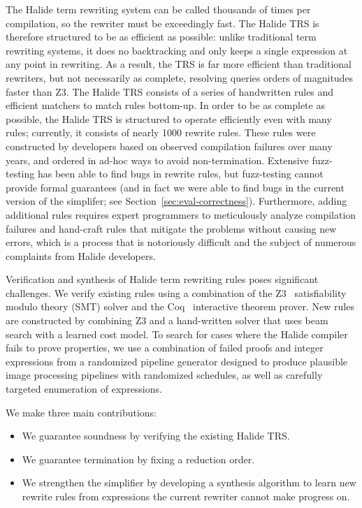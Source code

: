 \documentclass[sigplan,10pt,review,anonymous]{acmart}\settopmatter{printfolios=true,printccs=false,printacmref=false}
\begin{document}
The Halide term rewriting system can be called thousands of times per
compilation, so the rewriter must be exceedingly fast.  The Halide
TRS is therefore structured to be as efficient as possible: unlike traditional
term rewriting systems, it does no backtracking and only keeps a single expression
at any point in rewriting.  As a result, the TRS is far more efficient than traditional
rewriters, but not necessarily as complete, resolving queries orders of magnitudes faster than Z3.
The Halide TRS consists of a series of handwritten rules and efficient matchers
to match rules bottom-up. In order to be as complete as possible, the Halide TRS is structured
to operate efficiently even with many rules; currently, it consists of nearly 1000
rewrite rules.  These rules were constructed by developers based on
observed compilation failures over many years, and ordered in ad-hoc ways to
avoid non-termination. Extensive fuzz-testing has been able to find bugs in
rewrite rules, but fuzz-testing cannot provide formal guarantees (and in fact we
were able to find bugs in the current version of the simplifer;
see Section~\ref{sec:eval-correctness}). Furthermore, adding additional rules requires
expert programmers to meticulously analyze compilation failures and hand-craft
rules that mitigate the problems without causing new errors, which is a process
that is notoriously difficult and the subject of numerous complaints from
Halide developers.

Verification and synthesis
of Halide term rewriting rules poses significant challenges. We verify
existing rules using a combination of the Z3~\cite{de2008z3} satisfiability
modulo theory (SMT) solver and the Coq~\cite{coq19} interactive theorem prover. 
New rules are constructed by combining Z3 and a hand-written solver that uses beam
search with a learned cost model. To search for cases where the Halide compiler
fails to prove properties, we use a combination of failed proofs and integer expressions
from a randomized pipeline generator designed to produce plausible image processing
pipelines with randomized schedules, as well as carefully targeted enumeration
of expressions.

We make three main contributions:
\begin{itemize}
  \item We guarantee soundness by verifying the existing Halide TRS.
  \item We guarantee termination by fixing a reduction order.
  \item We strengthen the simplifier by developing a synthesis algorithm to learn new rewrite rules from expressions the current rewriter cannot make progress on.
\end{itemize}
\end{document}
